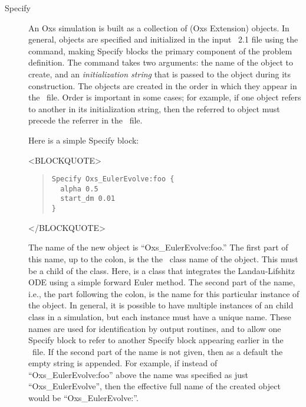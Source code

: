 \begin{description}
\item[Specify\label{html:specifyCmd}]
An Oxs simulation is built as a collection of  (Oxs
Extension) objects.  In general,  objects are specified and
initialized in the input \MIF~2.1 file using the  command,
making Specify blocks the primary component of the problem
definition.  The  command takes two arguments: the name of
the  object to create, and an {\it initialization string}
that is passed to the  object during its construction.
The objects are created in the order in which they appear in the \MIF\
file. Order is important in some cases; for example, if one 
object refers to another in its initialization string, then the referred
to object must precede the referrer in the \MIF\ file.

Here is a simple Specify block:
\begin{rawhtml}<BLOCKQUOTE>\end{rawhtml}
\begin{quote}
\begin{verbatim}
Specify Oxs_EulerEvolve:foo {
  alpha 0.5
  start_dm 0.01
}
\end{verbatim}
\end{quote}
\begin{rawhtml}</BLOCKQUOTE>\end{rawhtml}
The name of the new  object is ``Oxs\_EulerEvolve:foo.''
The first part of this name, up to the colon, is the the \Cplusplus\
class name of the object.  This must be a child of the 
class.  Here, \cd{Oxs\_EulerEvolve} is a class that integrates the
Landau-Lifshitz ODE using a simple forward Euler method.  The second
part of the name, i.e., the part following the colon, is the name for
this particular instance of the object.  In general, it is possible to
have multiple instances of an \cd{Oxs\_Ext} child class in a simulation,
but each instance must have a unique name.  These names are used for
identification by output routines, and to allow one Specify block to
refer to another Specify block appearing earlier in the \MIF\ file.  If
the second part of the name is not given, then as a default the empty
string is appended.  For example, if instead of ``Oxs\_EulerEvolve:foo''
above the name was specified as just ``Oxs\_EulerEvolve'', then the
effective full name of the created object would be
``Oxs\_EulerEvolve:''.


\end{description}
